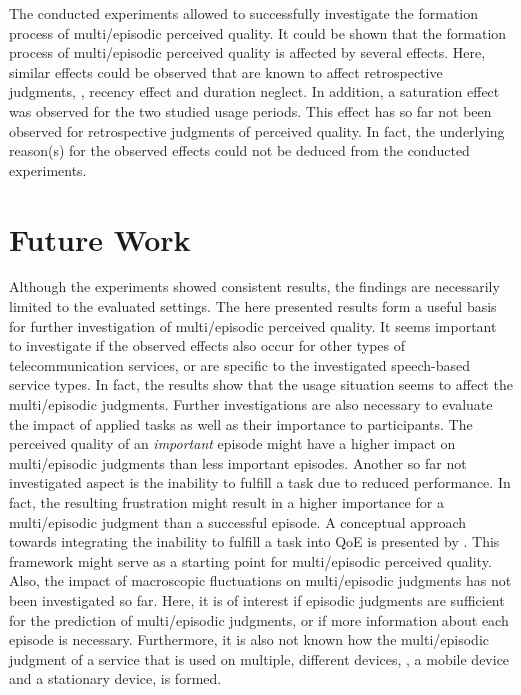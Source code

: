 The conducted experiments allowed to successfully investigate the formation process of multi\-/episodic perceived quality.
It could be shown that the formation process of multi\-/episodic perceived quality is affected by several effects.
Here, similar effects could be observed that are known to affect retrospective judgments, \ie, recency effect and duration neglect.
In addition, a saturation effect was observed for the two studied usage periods.
This effect has so far not been observed for retrospective judgments of perceived quality.
In fact, the underlying reason(s) for the observed effects could not be deduced from the conducted experiments.

\section{Future Work}
Although the experiments showed consistent results, the findings are necessarily limited to the evaluated settings.
The here presented results form a useful basis for further investigation of multi\-/episodic perceived quality.
It seems important to investigate if the observed effects also occur for other types of telecommunication services, or are specific to the investigated speech-based service types.
In fact, the results show that the usage situation seems to affect the multi\-/episodic judgments.
Further investigations are also necessary to evaluate the impact of applied tasks as well as their importance to participants.
The perceived quality of an \emph{important} episode might have a higher impact on multi\-/episodic judgments than less important episodes.
Another so far not investigated aspect is the inability to fulfill a task due to reduced performance.
In fact, the resulting frustration might result in a higher importance for a multi\-/episodic judgment than a successful episode.
A conceptual approach towards integrating the inability to fulfill a task into \ac{QoE} is presented by \citet{leon-garcia_generalizing_2014}.
This framework might serve as a starting point for multi\-/episodic perceived quality.
Also, the impact of macroscopic fluctuations on multi\-/episodic judgments has not been investigated so far.
Here, it is of interest if episodic judgments are sufficient for the prediction of multi\-/episodic judgments, or if more information about each episode is necessary.
Furthermore, it is also not known how the multi\-/episodic judgment of a service that is used on multiple, different devices, \eg, a mobile device and a stationary device, is formed.
